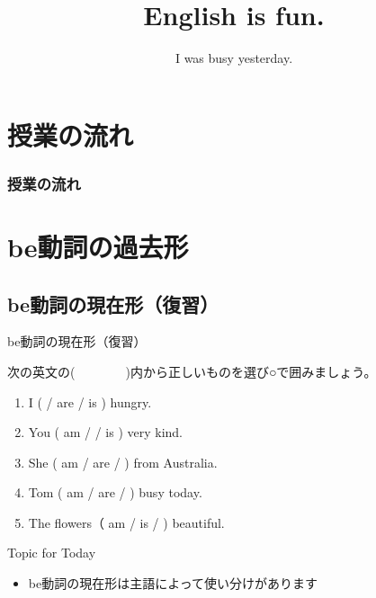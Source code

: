 \documentclass[aspectratio=169,xcolor={dvipsnames,table}]{beamer}
\title{English is fun.}
\subtitle{I was busy yesterday.}
\author{}
\institute[]{}
\date[]
\newcommand{\myaudio}[1]{\href{#1}{\faVolumeUp}}
\begin{document}
\begin{frame}[plain]
  \titlepage
\end{frame}

\section*{授業の流れ}
\begin{frame}[plain]
  \frametitle{授業の流れ}
  \tableofcontents
\end{frame}

\section{be動詞の過去形}

\subsection{be動詞の現在形（復習）}

\begin{frame}[plain]{be動詞の現在形（復習）}

次の英文の(~~~~~~~~)内から正しいものを選び○で囲みましょう。

\begin{enumerate}
 \item I (  / are  / is ) hungry.
 \item You ( am /  / is ) very kind.
 \item She ( am / are /  ) from Australia.
 \item Tom ( am / are /  ) busy today.
 \item The flowers（ am / is /  ) beautiful.
\end{enumerate}

\hfill\myaudio{./audio/024_past_be_01.mp3}

\begin{exampleblock}{Topic for Today}
\pause
\begin{itemize}\small
 \item be動詞の現在形は主語によって使い分けがあります
\end{itemize}
     \end{exampleblock}

\end{frame}
\end{document}
